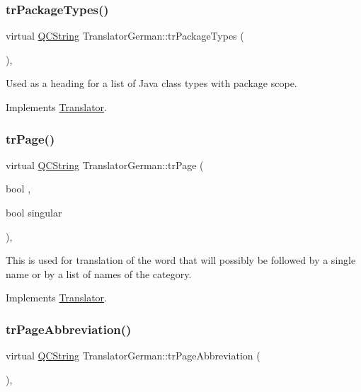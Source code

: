 \subsubsection{\texorpdfstring{trPackageTypes()}{trPackageTypes()}}
{\footnotesize\ttfamily virtual \mbox{\hyperlink{class_q_c_string}{Q\+C\+String}} Translator\+German\+::tr\+Package\+Types (\begin{DoxyParamCaption}{ }\end{DoxyParamCaption})\hspace{0.3cm}{\ttfamily [inline]}, {\ttfamily [virtual]}}

Used as a heading for a list of Java class types with package scope. 

Implements \mbox{\hyperlink{class_translator}{Translator}}.

\mbox{\label{class_translator_german_a5bac945a0f8b91fb34667d0724f69093}} 
\subsubsection{\texorpdfstring{trPage()}{trPage()}}
{\footnotesize\ttfamily virtual \mbox{\hyperlink{class_q_c_string}{Q\+C\+String}} Translator\+German\+::tr\+Page (\begin{DoxyParamCaption}\item[{bool}]{,  }\item[{bool}]{singular }\end{DoxyParamCaption})\hspace{0.3cm}{\ttfamily [inline]}, {\ttfamily [virtual]}}

This is used for translation of the word that will possibly be followed by a single name or by a list of names of the category. 

Implements \mbox{\hyperlink{class_translator}{Translator}}.

\mbox{\label{class_translator_german_a32b5aeca110a79a8a82e7f963aef0142}} 
\subsubsection{\texorpdfstring{trPageAbbreviation()}{trPageAbbreviation()}}
{\footnotesize\ttfamily virtual \mbox{\hyperlink{class_q_c_string}{Q\+C\+String}} Translator\+German\+::tr\+Page\+Abbreviation (\begin{DoxyParamCaption}{ }\end{DoxyParamCaption})\hspace{0.3cm}{\ttfamily [inline]}, {\ttfamily [virtual]}}


